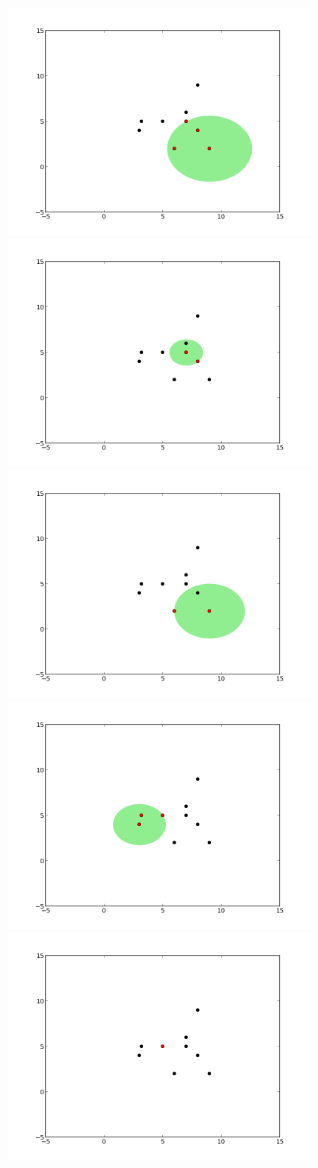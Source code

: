 \documentclass[12pt,fleqn]{article}\usepackage{../../common}
\begin{document}
\includegraphics[height=6cm]{knn4.png}
\includegraphics[height=6cm]{knn5.png}
\includegraphics[height=6cm]{knn6.png}
\includegraphics[height=6cm]{knn7.png}
\includegraphics[height=6cm]{knn8.png}
\end{document}
